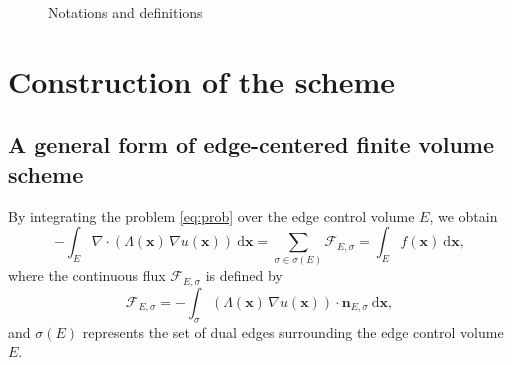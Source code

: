 \documentclass[times,review,preprint,authoryear]{elsarticle}
\newcommand{\bx}{\bm{x}}
\newcommand{\bn}{\bm{n}}
\begin{document}
\begin{figure}[h]
\centering
{}\label{fig:mesh}
\caption{Notations and definitions}
\end{figure}

\section{Construction of the scheme}\label{sec3}

\subsection{A general form of edge-centered finite volume scheme}

By integrating the problem \cref{eq:prob} over the edge control volume $E$, we obtain
\begin{equation}
- \int_{E} \nabla \cdot (\Lambda(\bx) \, \nabla u(\bx)) \ \mathrm{d} \bx = \sum_{\sigma \in \sigma(E)} \mathcal{F}_{E, \sigma} = \int_{E} f(\bx) \ \mathrm{d} \bx,
\end{equation}
where the continuous flux $\mathcal{F}_{E, \sigma}$ is defined by
\begin{equation*}
\mathcal{F}_{E, \sigma} = - \int_{\sigma} (\Lambda(\bx) \, \nabla u(\bx)) \cdot \bn_{E, \sigma} \ \mathrm{d} \bx,
\end{equation*}
and $\sigma(E)$ represents the set of dual edges surrounding the edge control volume $E$.
\end{document}
